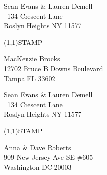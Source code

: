 \documentclass[12pt]{article}
\begin{document}
\begin{minipage}{.5\linewidth} \noindent
Sean Evans \& Lauren Demell\\\ 
134 Crescent Lane\\ 
Roslyn Heights NY 11577
\end{minipage}
\begin{minipage}{.5\linewidth \hspace{-.2in} \vspace{-.3in}}
\begin{flushright}
\framebox(1,1){STAMP}
\end{flushright}
\end{minipage}

\begin{center} \begin{Huge} \vspace*{\fill}
MacKenzie Brooks\\
12702 Bruce B Downs Boulevard\\
Tampa FL 33602\\
\vspace{\fill} \end{Huge} \end{center}

\clearpage

\begin{minipage}{.5\linewidth} \noindent
Sean Evans \& Lauren Demell\\\ 
134 Crescent Lane\\ 
Roslyn Heights NY 11577
\end{minipage}
\begin{minipage}{.5\linewidth \hspace{-.2in} \vspace{-.3in}}
\begin{flushright}
\framebox(1,1){STAMP}
\end{flushright}
\end{minipage}

\begin{center} \begin{Huge} \vspace*{\fill}
Anna \& Dave Roberts\\
909 New Jersey Ave SE \#605\\
Washington DC 20003\\
\vspace{\fill} \end{Huge} \end{center}

\clearpage
\end{document}
